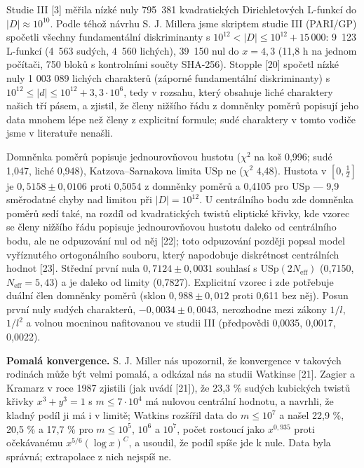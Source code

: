 \documentclass[
  10pt,
]{article}
\begin{document}
Studie III {[}3{]} měřila nízké nuly 795~381 kvadratických
Dirichletových L-funkcí do \(|D| \approx 10^{10}\). Podle téhož návrhu
S. J. Millera jsme skriptem studie III (PARI/GP) spočetli všechny
fundamentální diskriminanty s \(10^{12} < |D| \le 10^{12} + 15\,000\):
9~123 L-funkcí (4~563 sudých, 4~560 lichých), 39~150 nul do
\(x = 4{,}3\) (11,8 h na jednom počítači, 750 bloků s kontrolními součty
SHA-256). Stopple {[}20{]} spočetl nízké nuly 1 003 089 lichých
charakterů (záporné fundamentální diskriminanty) s
\(10^{12} \le |d| \le 10^{12} + 3{,}3\cdot10^6\), tedy v rozsahu, který
obsahuje liché charaktery našich tří pásem, a zjistil, že členy nižšího
řádu z domněnky poměrů popisují jeho data mnohem lépe než členy z
explicitní formule; sudé charaktery v tomto vodiče jsme v literatuře
nenašli.

Domněnka poměrů popisuje jednourovňovou hustotu (\(\chi^2\) na koš
0,996; sudé 1,047, liché 0,948), Katzova--Sarnakova limita USp ne
(\(\chi^2\) 4,48). Hustota v \([0, \frac12]\) je
\(0{,}5158 \pm 0{,}0106\) proti 0,5054 z domněnky poměrů a 0,4105 pro
USp --- 9,9 směrodatné chyby nad limitou při \(|D| = 10^{12}\). U
centrálního bodu zde domněnka poměrů sedí také, na rozdíl od
kvadratických twistů eliptické křivky, kde vzorec se členy nižšího řádu
popisuje jednourovňovou hustotu daleko od centrálního bodu, ale ne
odpuzování nul od něj {[}22{]}; toto odpuzování později popsal model
vyříznutého ortogonálního souboru, který napodobuje diskrétnost
centrálních hodnot {[}23{]}. Střední první nula
\(0{,}7124 \pm 0{,}0031\) souhlasí s USp\((2N_{\mathrm{eff}})\) (0,7150,
\(N_{\mathrm{eff}} = 5{,}43\)) a je daleko od limity (0,7827).
Explicitní vzorec i zde potřebuje duální člen domněnky poměrů (sklon
\(0{,}988 \pm 0{,}012\) proti 0,611 bez něj). Posun první nuly sudých
charakterů, \(-0{,}0034 \pm 0{,}0043\), nerozhodne mezi zákony \(1/l\),
\(1/l^2\) a volnou mocninou nafitovanou ve studii III (předpovědi
0,0035, 0,0017, 0,0022).

\textbf{Pomalá konvergence.} S. J. Miller nás upozornil, že konvergence
v takových rodinách může být velmi pomalá, a odkázal nás na studii
Watkinse {[}21{]}. Zagier a Kramarz v roce 1987 zjistili (jak uvádí
{[}21{]}), že 23,3 \% sudých kubických twistů křivky \(x^3 + y^3 = 1\) s
\(m \le 7\cdot10^4\) má nulovou centrální hodnotu, a navrhli, že kladný
podíl ji má i v limitě; Watkins rozšířil data do \(m \le 10^7\) a našel
22,9 \%, 20,5 \% a 17,7 \% pro \(m \le 10^5\), \(10^6\) a \(10^7\),
počet rostoucí jako \(x^{0{,}935}\) proti očekávanému
\(x^{5/6}(\log x)^C\), a usoudil, že podíl spíše jde k nule. Data byla
správná; extrapolace z nich nejspíš ne.
\end{document}
